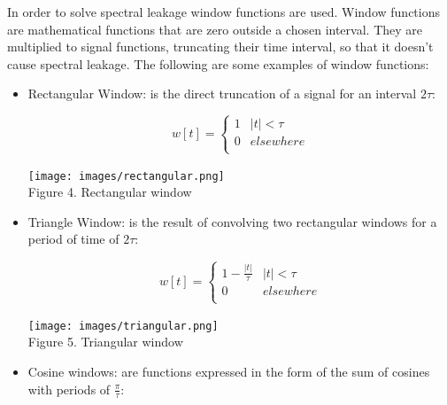  In order to solve spectral leakage window functions are used. Window functions are mathematical functions that are zero outside a chosen interval. They are multiplied to signal functions, truncating their time interval, so that it doesn't cause spectral leakage.  The following are some examples of window functions:
\begin{itemize}
    \item Rectangular Window: is the direct truncation of a signal for an interval $2\tau$:

        \begin{equation*}
          w[t]=
        \begin{cases}
          1  &|t| < \tau \\
          0  &elsewhere \\
        \end{cases}
      \end{equation*}
  
 
         \begin{center}
         \texttt{[image: images/rectangular.png]} \\
         Figure 4. Rectangular window
         \end{center}

    \item Triangle Window: is the result of convolving two rectangular windows for a period of time of $2\tau$:
  
         \begin{equation*}
          w[t]=
        \begin{cases}
          1 - \frac{|t|}{\tau}  &|t| < \tau \\
          0  &elsewhere \\
        \end{cases}
      \end{equation*}
  
 
         \begin{center}
         \texttt{[image: images/triangular.png]} \\
         Figure 5. Triangular window
         \end{center}

     \item Cosine windows: are functions expressed in the form of the sum of cosines
     with periods of $\frac{\pi}{\tau} $:



\end{itemize}
